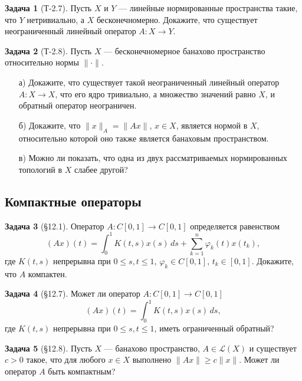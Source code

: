 \documentclass{article}
\theoremstyle{definition}
\newtheorem{problem}{Задача}
\begin{document}
\begin{problem}[Т-2.7]
Пусть $X$ и $Y$ --- линейные нормированные пространства такие, что
$Y$ нетривиально, а $X$ бесконечномерно. Докажите, что существует
неограниченный линейный оператор $A\colon X\to Y$.
\end{problem}

\begin{problem}[Т-2.8]
Пусть $X$ --- бесконечномерное банахово пространство относительно нормы $\|\cdot\|$.
\begin{enumerate}
\item[а)] Докажите, что существует такой неограниченный линейный оператор $A\colon X\to X$,
что его ядро тривиально, а множество значений равно $X$, и обратный оператор неограничен.
\item[б)] Докажите, что $\|x\|_A = \|Ax\|$, $x\in X$, является нормой в $X$, относительно
которой оно также является банаховым пространством.
\item[в)] Можно ли показать, что одна из двух рассматриваемых нормированных топологий в $X$
слабее другой?
\end{enumerate}
\end{problem}

\subsection{Компактные операторы}


\begin{problem}[\S 12.1]
Оператор $A\colon C[0,1] \to C[0,1]$ определяется равенством
\begin{equation*}
(Ax)(t) = \int_0^1 K(t,s) x(s) \, ds + \sum_{k=1}^n \varphi_k(t) x(t_k),
\end{equation*}
где $K(t,s)$ непрерывна при $0\le s,t \le 1$, $\varphi_k\in C[0,1]$, $t_k \in [0,1]$.
Докажите, что $A$ компактен.
\end{problem}

\begin{problem}[\S 12.7]
Может ли оператор $A\colon C[0,1] \to C[0,1]$
\begin{equation*}
(Ax)(t) = \int_0^1 K(t,s) x(s) \, ds,
\end{equation*}
где $K(t,s)$ непрерывна при $0 \le s, t \le 1$, иметь ограниченный обратный?
\end{problem}

\begin{problem}[\S 12.8]
Пусть $X$ --- банахово пространство, $A \in \mathcal L(X)$ и существует
$c>0$ такое, что для любого $x\in X$ выполнено $\|Ax\|\ge c\|x\|$.
Может ли оператор $A$ быть компактным?
\end{problem}
\end{document}
